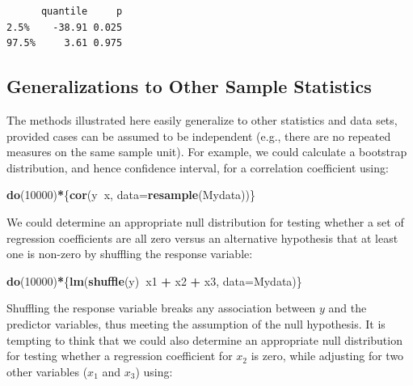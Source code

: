 \documentclass[fleqn,10pt]{wlpeerj} %
\newenvironment{Shaded}{\begin{snugshade}}{\end{snugshade}}
\newcommand{\DataTypeTok}[1]{\textcolor[rgb]{0.13,0.29,0.53}{#1}}
\newcommand{\DecValTok}[1]{\textcolor[rgb]{0.00,0.00,0.81}{#1}}
\newcommand{\KeywordTok}[1]{\textcolor[rgb]{0.13,0.29,0.53}{\textbf{#1}}}
\newcommand{\NormalTok}[1]{#1}
\newcommand{\OperatorTok}[1]{\textcolor[rgb]{0.81,0.36,0.00}{\textbf{#1}}}
\newcommand{\StringTok}[1]{\textcolor[rgb]{0.31,0.60,0.02}{#1}}
\begin{document}
\begin{verbatim}
      quantile     p
2.5%    -38.91 0.025
97.5%     3.61 0.975
\end{verbatim}

\hypertarget{generalizations-to-other-sample-statistics}{%
\subsection*{Generalizations to Other Sample Statistics}\label{generalizations-to-other-sample-statistics}}

The methods illustrated here easily generalize to other statistics and data sets, provided cases can be assumed to be independent (e.g., there are no repeated measures on the same sample unit). For example, we could calculate a bootstrap distribution, and hence confidence interval, for a correlation coefficient using:

\begin{Shaded}
\begin{Highlighting}[]
\KeywordTok{do}\NormalTok{(}\DecValTok{10000}\NormalTok{)}\OperatorTok{*}\NormalTok{\{}\KeywordTok{cor}\NormalTok{(y}\OperatorTok{~}\NormalTok{x, }\DataTypeTok{data=}\KeywordTok{resample}\NormalTok{(Mydata))\}}
\end{Highlighting}
\end{Shaded}

We could determine an appropriate null distribution for testing whether a set of regression coefficients are all zero versus an alternative hypothesis that at least one is non-zero by shuffling the response variable:

\begin{Shaded}
\begin{Highlighting}[]
\KeywordTok{do}\NormalTok{(}\DecValTok{10000}\NormalTok{)}\OperatorTok{*}\NormalTok{\{}\KeywordTok{lm}\NormalTok{(}\KeywordTok{shuffle}\NormalTok{(y)}\OperatorTok{~}\NormalTok{x1 }\OperatorTok{+}\StringTok{ }\NormalTok{x2 }\OperatorTok{+}\StringTok{ }\NormalTok{x3, }\DataTypeTok{data=}\NormalTok{Mydata)\}}
\end{Highlighting}
\end{Shaded}

Shuffling the response variable breaks any association between \(y\) and the predictor variables, thus meeting the assumption of the null hypothesis. It is tempting to think that we could also determine an appropriate null distribution for testing whether a regression coefficient for \(x_2\) is zero, while adjusting for two other variables (\(x_1\) and \(x_3\)) using:
\end{document}
